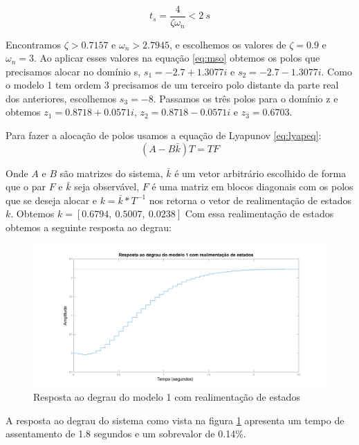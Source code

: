 \begin{equation}\label{eq:ts}
t_s=\dfrac{4}{\zeta \omega_n}<2~s
\end{equation}

Encontramos $\zeta>0.7157$ e $\omega_n>2.7945$, e escolhemos os valores de $\zeta=0.9$ e $\omega_n=3$. Ao aplicar esses valores na equação \eqref{eq:mso} obtemos os polos que precisamos alocar no domínio s, $s_1=-2.7+1.3077 i$ e $s_2=-2.7-1.3077i$. Como o modelo 1 tem ordem 3 precisamos de um terceiro polo distante da parte real dos anteriores, escolhemos $s_3=-8$. Passamos os três polos para o domínio z e obtemos $z_1=0.8718+0.0571i$, $z_2=0.8718-0.0571i$ e $z_3=0.6703$. 


Para fazer a alocação de polos usamos a equação de Lyapunov
\eqref{eq:lyapeq}:
\begin{equation}\label{eq:lyapeq}
(A-B\bar{k})T=TF
\end{equation}

Onde $A$ e $B$ são matrizes do sistema, $\bar{k}$ é um vetor arbitrário escolhido de forma que o par $F$ e $\bar{k}$ seja observável, $F$ é uma matriz em blocos diagonais com os polos que se deseja alocar e $k=\bar{k}*T^{-1}$ nos retorna o vetor de realimentação de estados $k$. Obtemos $k=[0.6794,~ 0.5007,~ 0.0238]$ Com essa realimentação de estados obtemos a seguinte resposta ao degrau:

\begin{figure}[H]
	\centering
	\includegraphics[width=1.1\linewidth]{respostadegraumodelo1realimentacao}
	\caption[Resposta ao degrau do modelo 1 com realimentação de estados]{}
	\caption{Resposta ao degrau do modelo 1 com realimentação de estados}
	\label{fig:respostadegraumodelo1realimentacao}
\end{figure}

A resposta ao degrau do sistema como vista na figura \ref{fig:respostadegraumodelo1realimentacao} apresenta um tempo de assentamento de 1.8 segundos e um sobrevalor de 0.14\%.

